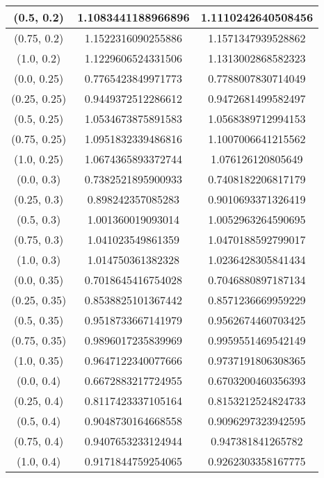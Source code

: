 \begin{table}[H]
\begin{tabular}{|c|c|c|}
\hline
(0.5, 0.2) & 1.1083441188966896 & 1.1110242640508456 \\
\hline
(0.75, 0.2) & 1.1522316090255886 & 1.1571347939528862 \\
\hline
(1.0, 0.2) & 1.1229606524331506 & 1.1313002868582323 \\
\hline
\hline
(0.0, 0.25) & 0.7765423849971773 & 0.7788007830714049 \\
\hline
(0.25, 0.25) & 0.9449372512286612 & 0.9472681499582497 \\
\hline
(0.5, 0.25) & 1.0534673875891583 & 1.0568389712994153 \\
\hline
(0.75, 0.25) & 1.0951832339486816 & 1.1007006641215562 \\
\hline
(1.0, 0.25) & 1.0674365893372744 & 1.076126120805649 \\
\hline
\hline
(0.0, 0.3) & 0.7382521895900933 & 0.7408182206817179 \\
\hline
(0.25, 0.3) & 0.898242357085283 & 0.9010693371326419 \\
\hline
(0.5, 0.3) & 1.001360019093014 & 1.0052963264590695 \\
\hline
(0.75, 0.3) & 1.041023549861359 & 1.0470188592799017 \\
\hline
(1.0, 0.3) & 1.014750361382328 & 1.0236428305841434 \\
\hline
\hline
(0.0, 0.35) & 0.7018645416754028 & 0.7046880897187134 \\
\hline
(0.25, 0.35) & 0.8538825101367442 & 0.8571236669959229 \\
\hline
(0.5, 0.35) & 0.9518733667141979 & 0.9562674460703425 \\
\hline
(0.75, 0.35) & 0.9896017235839969 & 0.9959551469542149 \\
\hline
(1.0, 0.35) & 0.9647122340077666 & 0.9737191806308365 \\
\hline
\hline
(0.0, 0.4) & 0.6672883217724955 & 0.6703200460356393 \\
\hline
(0.25, 0.4) & 0.8117423337105164 & 0.8153212524824733 \\
\hline
(0.5, 0.4) & 0.9048730164668558 & 0.9096297323942595 \\
\hline
(0.75, 0.4) & 0.9407653233124944 & 0.947381841265782 \\
\hline
(1.0, 0.4) & 0.9171844759254065 & 0.9262303358167775 \\
\hline
\end{tabular}
\end{table}
